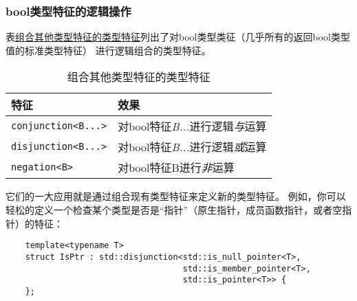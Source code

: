 \subsubsection{bool类型特征的逻辑操作}
表\hyperref[t21.2]{组合其他类型特征的类型特征}列出了对bool类型类征（几乎所有的返回bool类型值的标准类型特征）
进行逻辑组合的类型特征。
\begin{table}[htb]
    \centering
    \begin{tabular}{l|l}
        \hline
        \textbf{特征}                & \textbf{效果}                      \\
        \hline
        \texttt{conjunction<B...>} & 对bool特征\emph{B...}进行逻辑\emph{与}运算 \\
        \texttt{disjunction<B...>} & 对bool特征\emph{B...}进行逻辑\emph{或}运算 \\
        \texttt{negation<B>}       & 对bool特征B进行\emph{非}运算             \\
        \hline
    \end{tabular}
    \caption{组合其他类型特征的类型特征}
    \label{t21.2}
\end{table}

它们的一大应用就是通过组合现有类型特征来定义新的类型特征。
例如，你可以轻松的定义一个检查某个类型是否是“指针”（原生指针，成员函数指针，或者空指针）的特征：
\begin{lstlisting}
    template<typename T>
    struct IsPtr : std::disjunction<std::is_null_pointer<T>,
                                    std::is_member_pointer<T>,
                                    std::is_pointer<T>> {
    };
\end{lstlisting}

